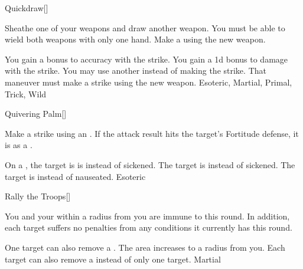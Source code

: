 \lowercase{\hypertarget{maneuver:Quickdraw}{}}\label{maneuver:Quickdraw}
\hypertarget{maneuver:Quickdraw}{}
\begin{freeability}[Rank 1]{Quickdraw}[]

Sheathe one of your weapons and draw another weapon.
You must be able to wield both weapons with only one hand.
Make a  using the new weapon.

\rankline
{} You gain a  bonus to accuracy with the strike.
 You gain a \plus1d bonus to damage with the strike.
 You may use another  instead of making the strike.
That maneuver must make a strike using the new weapon.
 Esoteric, Martial, Primal, Trick, Wild
\end{freeability}
\vspace{0.25em}



\lowercase{\hypertarget{maneuver:Quivering Palm}{}}\label{maneuver:Quivering Palm}
\hypertarget{maneuver:Quivering Palm}{}
\begin{freeability}[Rank 1]{Quivering Palm}[]

Make a strike using an .
If the attack result hits the target's Fortitude defense,
it is  as a .

\rankline
{} On a , the target is is  instead of sickened.
 The target is  instead of sickened.
 The target is  instead of nauseated.
 Esoteric
\end{freeability}
\vspace{0.25em}



\lowercase{\hypertarget{maneuver:Rally the Troops}{}}\label{maneuver:Rally the Troops}
\hypertarget{maneuver:Rally the Troops}{}
\begin{freeability}[Rank 1]{Rally the Troops}[]

You and your  within a \areamed radius from you are immune to  this round.
In addition, each target suffers no penalties from any conditions it currently has this round.

\rankline
{} One target can also remove a .
 The area increases to a \arealarge radius from you.
 Each target can also remove a  instead of only one target.
 Martial
\end{freeability}
\vspace{0.25em}



